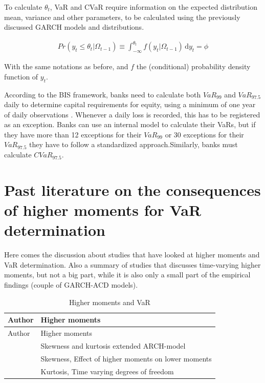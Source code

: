 \documentclass[a4paper, twoside]{templates/ociamthesis}
\begin{document}
To calculate \(\theta_t\), VaR and CVaR require information on the expected distribution mean, variance and other parameters, to be calculated using the previously discussed GARCH models and distributions.

\begin{align}
Pr(y_t \le \theta_t | \Omega_{t-1}) \equiv \int_{-\infty}^{\theta_t} \! f(y_t | \Omega_{t-1}) \, \mathrm{d}y_t = \phi
 \label{eq:eq23}
\end{align}

With the same notations as before, and \(f\) the (conditional) probability density function of \(y_t\).

According to the BIS framework, banks need to calculate both \(VaR_{99}\) and \(VaR_{97.5}\) daily to determine capital requirements for equity, using a minimum of one year of daily observations \autocite{baselcommitteeonbankingsupervision2016}. Whenever a daily loss is recorded, this has to be registered as an exception. Banks can use an internal model to calculate their VaRs, but if they have more than 12 exceptions for their \(VaR_{99}\) or 30 exceptions for their \(VaR_{97.5}\) they have to follow a standardized approach.Similarly, banks must calculate \(CVaR_{97.5}\).

\hypertarget{past-lit}{%
\section{Past literature on the consequences of higher moments for VaR determination}\label{past-lit}}

Here comes the discussion about studies that have looked at higher moments and VaR determination. Also a summary of studies that discusses time-varying higher moments, but not a big part, while it is also only a small part of the empirical findings (couple of GARCH-ACD models).

\begin{longtable}[]{@{}ll@{}}
\caption{Higher moments and VaR}\tabularnewline
\toprule
Author & Higher moments\tabularnewline
\midrule
\endfirsthead
\toprule
Author & Higher moments\tabularnewline
\midrule
\endhead
\textcite{hansen1994} & Skewness and kurtosis extended ARCH-model\tabularnewline
\textbackslash@harvey1999 & Skewness, Effect of higher moments on lower moments\tabularnewline
\textcite{brooks2005} & Kurtosis, Time varying degrees of freedom\tabularnewline
\bottomrule
\end{longtable}
\end{document}
